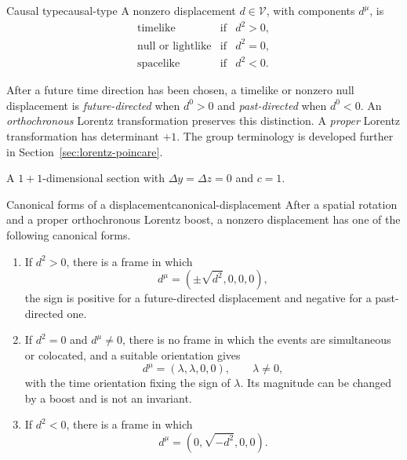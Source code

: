 \documentclass[11pt,a4paper]{article}
\begin{document}
\begin{definition}{Causal type}{causal-type}
A nonzero displacement \(d\in\mathcal V\), with components \(d^\mu\), is
\[
\begin{array}{lll}
  \text{timelike}  &\text{if}& d^2>0,\\
  \text{null or lightlike} &\text{if}& d^2=0,\\
  \text{spacelike} &\text{if}& d^2<0.
\end{array}
\]
\end{definition}

After a future time direction has been chosen, a timelike or nonzero null
displacement is \emph{future-directed} when \(d^0>0\) and
\emph{past-directed} when \(d^0<0\). An \emph{orthochronous} Lorentz
transformation preserves this distinction. A \emph{proper} Lorentz
transformation has determinant \(+1\). The group terminology is developed
further in Section~\ref{sec:lorentz-poincare}.

\begin{center}

{\small A \(1+1\)-dimensional section with
\(\Delta y=\Delta z=0\) and \(c=1\).}
\end{center}

\begin{theorem}{Canonical forms of a displacement}{canonical-displacement}
After a spatial rotation and a proper orthochronous Lorentz boost, a nonzero
displacement has one of the following canonical forms.
\begin{enumerate}
  \item If \(d^2>0\), there is a frame in which
  \[
    d^\mu=(\pm\sqrt{d^2},0,0,0),
  \]
  the sign is positive for a future-directed displacement and negative for a
  past-directed one.
  \item If \(d^2=0\) and \(d^\mu\ne0\), there is no frame in which the events
  are simultaneous or colocated, and a suitable orientation gives
  \[
    d^\mu=(\lambda,\lambda,0,0),\qquad \lambda\ne0,
  \]
  with the time orientation fixing the sign of \(\lambda\). Its magnitude
  can be changed by a boost and is not an invariant.
  \item If \(d^2<0\), there is a frame in which
  \[
    d^\mu=(0,\sqrt{-d^2},0,0).
  \]
\end{enumerate}
\end{theorem}
\end{document}
